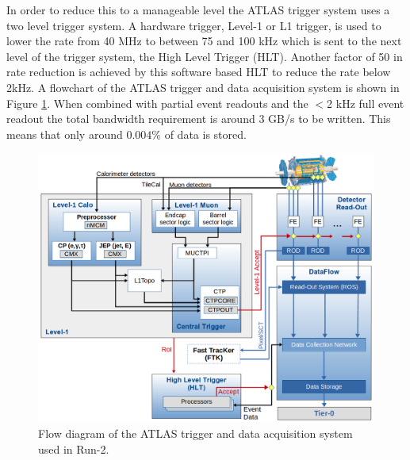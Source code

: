 In order to reduce this to a manageable level the ATLAS trigger system uses a two level trigger system.  A hardware trigger, Level-1 or L1 trigger, is used to lower the rate from 40 MHz to between 75 and 100 kHz which is sent to the next level of the trigger system, the High Level Trigger (HLT).  Another factor of 50 in rate reduction is achieved by this software based HLT to reduce the rate below 2kHz.  A flowchart of the ATLAS trigger and data acquisition system is shown in Figure \ref{fig:ATLAStdaq}.  When combined with partial event readouts and the $<$2 kHz full event readout the total bandwidth requirement is around 3 GB/s to be written.  This means that only around $0.004\%$ of data is stored.
\begin{figure}[ht!]
	\centering
	\includegraphics[width=\columnwidth]{../ThesisImages/LHCImages/ATLASTDAQR2.png}
	\caption[Flow diagram of the ATLAS trigger and data acquisition system used in Run-2.]{Flow diagram of the ATLAS trigger and data acquisition system used in Run-2\cite{ATLASTDAQ}.
	}
	\label{fig:ATLAStdaq}
\end{figure}

